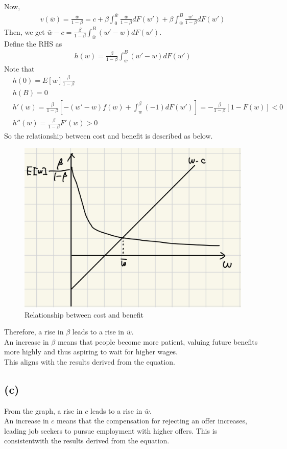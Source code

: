 \documentclass{ltjsarticle}
\begin{document}
Now,
\begin{align*}
    v(\bar{w}) = \frac{\bar{w}}{1 - \beta} = c + \beta \int_0^{\bar{w}} 
 \frac{\bar{w}}{1 - \beta} dF(w') + \beta \int^B_{\bar{w}} \frac{w'}{1 - \beta} dF(w')
\end{align*}
Then, we get $\bar{w} - c = \frac{\beta}{1 - \beta} \int^B_{\bar{w}} (w' - w)dF(w')$.\\
Define the RHS as
\begin{align*}
    h(w) = \frac{\beta}{1 - \beta} \int^B_{\bar{w}} (w' - w) dF(w')
\end{align*}
Note that
\begin{align*}
    &h(0) = E[w] \frac{\beta}{1 - \beta}\\
    &h(B) = 0\\
    &h'(w) = \frac{\beta}{1 - \beta} [ -(w' - w) f(w) + \int^\beta_w (-1) dF(w') ] = - \frac{\beta}{1 - \beta} [1 - F(w)] < 0\\
    & h''(w) = \frac{\beta}{1 - \beta} F'(w) > 0
\end{align*}
So the relationship between cost and benefit is described as below.\\
\begin{figure}
    \centering
    \includegraphics[width=0.5\linewidth]{hw3_1_graph.jpg}
    \caption{Relationship between cost and benefit}
    \label{fig:enter-label}
\end{figure}
Therefore, a rise in $\beta$ leads to a rise in $\bar{w}$.\\
An increase in $\beta$ means that people become more patient, valuing future benefits more highly and thus aspiring to wait for higher wages.\\
This aligns with the results derived from the equation.

\subsection*{(c)}
From the graph, a rise in $c$ leads to a rise in $\bar{w}$.\\
An increase in $c$ means that the compensation for rejecting an offer increases, leading job seekers to pursue employment with higher offers. This is consistentwith the results derived from the equation.
\end{document}
